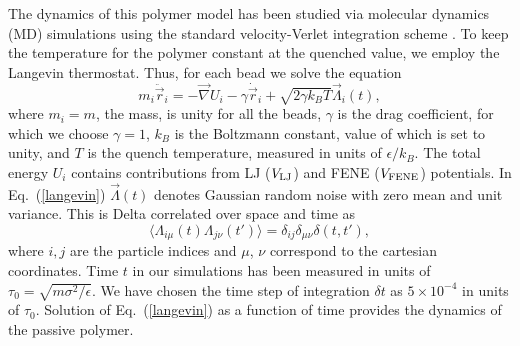 \documentclass[aps,prx,reprint,showpacs,showkeys,noeprint,longbibliography]{revtex4-1} %
\begin{document}
\par
The dynamics of this  polymer model has been studied via molecular dynamics (MD) simulations using the standard velocity-Verlet integration scheme \cite{frenkel}.  
To keep the temperature for the polymer constant at the quenched value, we employ the Langevin thermostat. 
Thus, for each bead we solve the equation
\begin{equation}\label{langevin}
 m_i \ddot{\vec{r}}_i = - \vec{\nabla} U_i - \gamma \dot{\vec{r}}_i + \sqrt{2 \gamma k_B T } \vec{\Lambda}_i(t),
\end{equation}
where $m_i=m$, the mass, is unity for all the beads,  $\gamma$ is the drag coefficient, for which we choose $\gamma=1$, $k_B$ is the Boltzmann constant, value of which 
is set to unity, and $T$ is the quench temperature, measured in units of $\epsilon/k_B$. The total energy $U_i$  contains contributions from LJ ($V_{\rm{LJ}}$) and FENE ($V_{\rm{FENE}}$) potentials.
 In Eq.~(\ref{langevin}) $\vec{\Lambda}(t)$ denotes Gaussian random noise with zero mean and unit variance. This is  Delta correlated over
space and time as 
\begin{equation}
 \langle\Lambda_{i\mu}(t)\Lambda_{j\nu}(t')\rangle = \delta_{ij}\delta_{\mu \nu} \delta(t,t'),
\end{equation}
where $i,j$ are the particle indices and $\mu$, $\nu$ correspond to 
the cartesian coordinates. Time $t$ in our simulations has been measured in 
units of $\tau_0 = \sqrt{m \sigma^2/\epsilon}$. We have chosen the time 
step of integration $\delta t$ as $5 \times 10^{-4}$ in units of $\tau_0$. Solution of Eq.~(\ref{langevin}) as a function of time provides the dynamics of the passive polymer.
\end{document}
